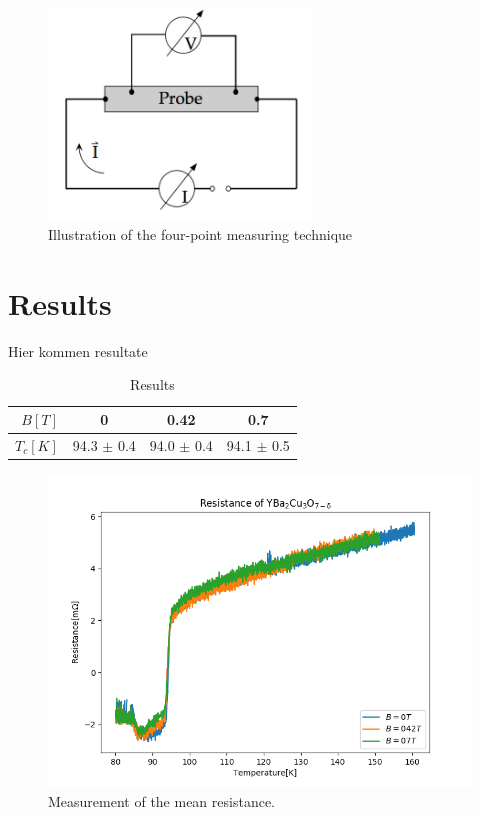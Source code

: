 \documentclass[a4paper,parskip,11pt, DIV12]{scrreprt}
\begin{document}
\begin{figure}[H]
\centering
\includegraphics[width=7cm]{vierpunkt.png}
\caption{Illustration of the four-point measuring technique}
\end{figure}




\chapter{Results}
Hier kommen resultate
\begin{framed}
\begin{table}[H]
\centering
\renewcommand{\arraystretch}{1.2} %
\setlength{\tabcolsep}{3mm} %
\footnotesize
\begin{tabular}{r|ccc}
$B[T]$ & 0 & 0.42 & 0.7 \\ 
\hline 
$T_{c} [K]$ & 94.3 $\pm$ 0.4 & 94.0 $\pm$ 0.4 & 94.1 $\pm$ 0.5 \\ 
\end{tabular}
\caption[]{Results}
\end{table} 
\end{framed}





\begin{figure}[H]
\centering
\includegraphics[scale=0.5]{Widerstand}
\caption[]{Measurement of the mean resistance.}
\end{figure}
\end{document}
